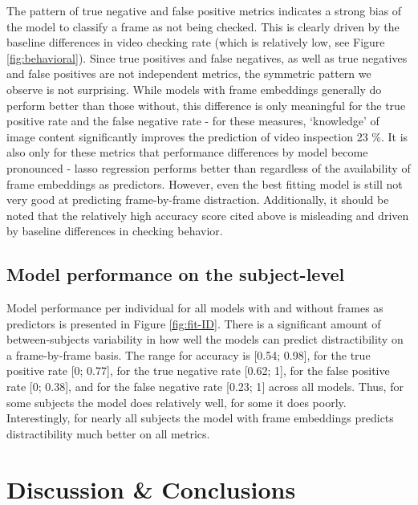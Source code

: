 \documentclass[
  man,floatsintext]{apa6}
\begin{document}
The pattern of true negative and false positive metrics indicates a strong bias of the model to classify a frame as not being checked. This is clearly driven by the baseline differences in video checking rate (which is relatively low, see Figure \ref{fig:behavioral}). Since true positives and false negatives, as well as true negatives and false positives are not independent metrics, the symmetric pattern we observe is not surprising. While models with frame embeddings generally do perform better than those without, this difference is only meaningful for the true positive rate and the false negative rate - for these measures, `knowledge' of image content significantly improves the prediction of video inspection 23 \%. It is also only for these metrics that performance differences by model become pronounced - lasso regression performs better than regardless of the availability of frame embeddings as predictors. However, even the best fitting model is still not very good at predicting frame-by-frame distraction.
Additionally, it should be noted that the relatively high accuracy score cited above is misleading and driven by baseline differences in checking behavior.

\hypertarget{model-performance-on-the-subject-level}{%
\subsection{Model performance on the subject-level}\label{model-performance-on-the-subject-level}}

Model performance per individual for all models with and without frames as predictors is presented in Figure \ref{fig:fit-ID}. There is a significant amount of between-subjects variability in how well the models can predict distractibility on a frame-by-frame basis. The range for accuracy is {[}0.54; 0.98{]}, for the true positive rate {[}0; 0.77{]}, for the true negative rate {[}0.62; 1{]}, for the false positive rate {[}0; 0.38{]}, and for the false negative rate {[}0.23; 1{]} across all models. Thus, for some subjects the model does relatively well, for some it does poorly. Interestingly, for nearly all subjects the model with frame embeddings predicts distractibility much better on all metrics.

\hypertarget{discussion-conclusions}{%
\section{Discussion \& Conclusions}\label{discussion-conclusions}}
\end{document}
